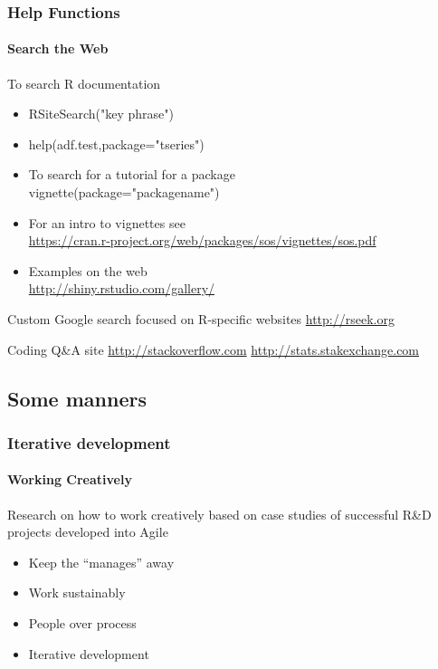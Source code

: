 \documentclass[10pt,handout,english]{beamer}\usepackage[]{graphicx}\usepackage[]{color}
\begin{document}
\begin{frame}
  \frametitle{Help Functions}
  \framesubtitle{Search the Web}
\begin{block}{To search R documentation}
\begin{itemize}
\item RSiteSearch("key phrase")
\item help(adf.test,package="tseries")
\item To search for a tutorial for a package\\
 vignette(package="packagename")
\item For an intro to vignettes see\\
\url{https://cran.r-project.org/web/packages/sos/vignettes/sos.pdf}
\item Examples on the web\\
\url{http://shiny.rstudio.com/gallery/}
\end{itemize}
\end{block}
\begin{block}{Custom Google search focused on R-specific websites}
\url{http://rseek.org}
\end{block}

\begin{block}{Coding Q\&A site}
\url{http://stackoverflow.com}
\url{http://stats.stakexchange.com}
\end{block}

\end{frame}

\subsection*{Some manners}
\begin{frame}
  \frametitle{Iterative development}
  \framesubtitle{Working Creatively}
Research on how to work creatively based on case studies of  successful R\&D projects developed into Agile
\begin{itemize}
\item Keep the ``manages'' away
\item Work sustainably
\item People over process
\item Iterative development
\end{itemize}
\end{frame}
\end{document}
